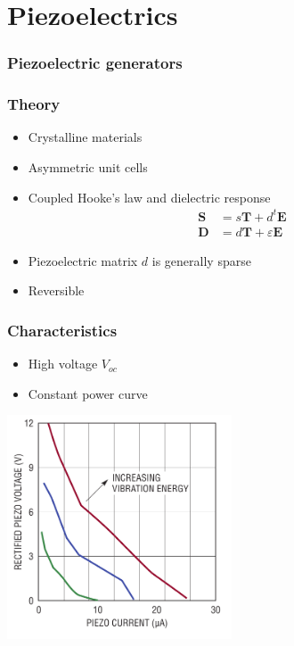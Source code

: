 \documentclass{beamer}
\renewcommand{\vec}{\mathbf}
\begin{document}
\section{Piezoelectrics}

\begin{frame}
  \frametitle{Piezoelectric generators}
\end{frame}

\begin{frame}
  \frametitle{Theory}

\begin{itemize}
  \item Crystalline materials
  \item Asymmetric unit cells
  \item Coupled Hooke's law and dielectric response
  \begin{align*}
 \vec S &= s \vec T + d^t \vec E \\
 \vec D &= d \vec T + \varepsilon \vec E
  \end{align*}
  \item Piezoelectric matrix $d$ is generally sparse
  \item Reversible
\end{itemize}


\end{frame}

\begin{frame}
  \frametitle{Characteristics}
\begin{itemize}
  \item High voltage $V_{oc}$
  \item Constant power curve
\end{itemize}

\begin{center}
\includegraphics[width=0.5\textwidth]{./Slike/Piezo-UI}
\end{center}
  
\end{frame}
\end{document}
